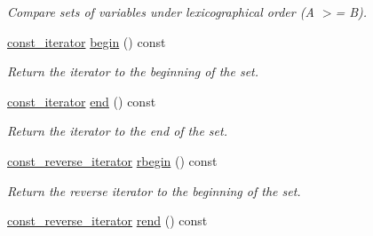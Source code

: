 \begin{DoxyCompactItemize}
\begin{DoxyCompactList}\small\item\em Compare sets of variables under lexicographical order (A $>$= B). \end{DoxyCompactList}\item 
\hyperlink{classmerlin_1_1variable__set_1_1const__iterator}{const\+\_\+iterator} \hyperlink{classmerlin_1_1variable__set_a72822ad33e7d18919cda9bf721aab9c8}{begin} () const \hypertarget{classmerlin_1_1variable__set_a72822ad33e7d18919cda9bf721aab9c8}{}\label{classmerlin_1_1variable__set_a72822ad33e7d18919cda9bf721aab9c8}

\begin{DoxyCompactList}\small\item\em Return the iterator to the beginning of the set. \end{DoxyCompactList}\item 
\hyperlink{classmerlin_1_1variable__set_1_1const__iterator}{const\+\_\+iterator} \hyperlink{classmerlin_1_1variable__set_ae684fea7c4516f9555bb0537e86101d4}{end} () const \hypertarget{classmerlin_1_1variable__set_ae684fea7c4516f9555bb0537e86101d4}{}\label{classmerlin_1_1variable__set_ae684fea7c4516f9555bb0537e86101d4}

\begin{DoxyCompactList}\small\item\em Return the iterator to the end of the set. \end{DoxyCompactList}\item 
\hyperlink{classmerlin_1_1variable__set_a4d523eb96935f7215e5b6f2e968f7f0a}{const\+\_\+reverse\+\_\+iterator} \hyperlink{classmerlin_1_1variable__set_a0b49d4d2a5329621f7d4f10ab6198791}{rbegin} () const \hypertarget{classmerlin_1_1variable__set_a0b49d4d2a5329621f7d4f10ab6198791}{}\label{classmerlin_1_1variable__set_a0b49d4d2a5329621f7d4f10ab6198791}

\begin{DoxyCompactList}\small\item\em Return the reverse iterator to the beginning of the set. \end{DoxyCompactList}\item 
\hyperlink{classmerlin_1_1variable__set_a4d523eb96935f7215e5b6f2e968f7f0a}{const\+\_\+reverse\+\_\+iterator} \hyperlink{classmerlin_1_1variable__set_aa1700c00f84ce93c23561e22bb621711}{rend} () const \hypertarget{classmerlin_1_1variable__set_aa1700c00f84ce93c23561e22bb621711}{}\label{classmerlin_1_1variable__set_aa1700c00f84ce93c23561e22bb621711}


\end{DoxyCompactItemize}
